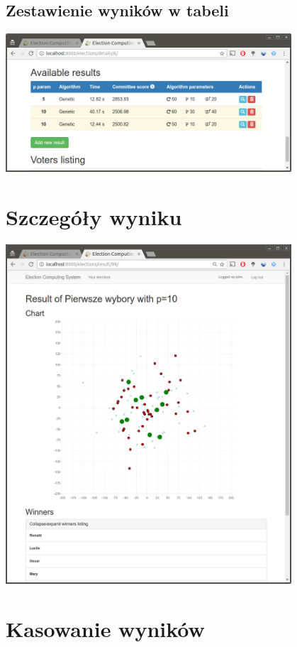 \documentclass[pdflatex,11pt]{../aghdoc}
\begin{document}
\newpage
\subsection{Zestawienie wyników w tabeli}
\label{subsec:tabelazwynikami}

\includegraphics[width=0.8\textwidth]{pics/results-on-table.png}


\newpage
\section{Szczegóły wyniku}
\label{sec:szczegolywyniku}

\includegraphics[width=0.8\textwidth]{pics/result-details.png}


\newpage
\section{Kasowanie wyników}
\label{sec:kasowaniewynikow}
\end{document}
